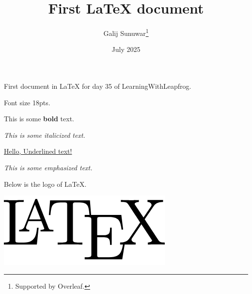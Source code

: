 \documentclass[18pt, letterpaper]{article}
\title{First LaTeX document}
\author{Galij Sunuwar\thanks{Supported by Overleaf.}}
\date{July 2025}
\begin{document}
\maketitle
    First document in LaTeX for day 35 of LearningWithLeapfrog.
    
    Font size 18pts.
    
    This is some \textbf{bold} text.
    
    \textit{This is some italicized text.}
    
    \underline{Hello, Underlined text!}
    
    \emph{This is some emphasized text.}

    Below is the logo of LaTeX.

    
    \includegraphics{logo.png}
\end{document}
